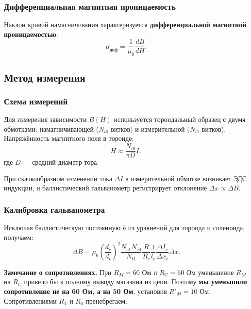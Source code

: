 \documentclass[a4paper]{article}
\begin{document}
	\subsubsection{Дифференциальная магнитная проницаемость}
	
	Наклон кривой намагничивания характеризуется \textbf{дифференциальной магнитной проницаемостью}:
	\begin{equation}
		\mu_{\text{диф}} = \frac{1}{\mu_0} \frac{dB}{dH}.
		\label{eq:mu_diff}
	\end{equation}
	
	\subsection{Метод измерения}
	
	\subsubsection{Схема измерений}
	
	Для измерения зависимости $B(H)$ используется тороидальный образец с двумя обмотками: намагничивающей ($N_{t0}$ витков) и измерительной ($N_{t1}$ витков). Напряжённость магнитного поля в тороиде:
	\begin{equation}
		H \approx \frac{N_{t0}}{\pi D} I,
		\label{eq:H}
	\end{equation}
	где $D$ — средний диаметр тора.
	
	При скачкообразном изменении тока $\Delta I$ в измерительной обмотке возникает ЭДС индукции, и баллистический гальванометр регистрирует отклонение $\Delta x \propto \Delta B$.
	
	\subsubsection{Калибровка гальванометра}
	
	Исключая баллистическую постоянную $b$ из уравнений для тороида и соленоида, получаем:
	\begin{equation}
		\Delta B = \mu_0 \left(\frac{d_c}{d_t}\right)^2 \frac{N_{c1} N_{c0}}{N_{t1}} \frac{R}{R_c} \frac{1}{l_c} \frac{\Delta I_c}{\Delta x_c} \Delta x.
		\label{eq:dB}
	\end{equation}
	
	\textbf{Замечание о сопротивлениях.} При $R_M = 60$ Ом и $R_C = 60$ Ом уменьшение $R_M$ на $R_C$ привело бы к полному выводу магазина из цепи. Поэтому \textbf{мы уменьшили сопротивление не на 60 Ом, а на 50 Ом}, установив $R'_M = 10$ Ом. Сопротивлениями $R_T$ и $R_0$ пренебрегаем.
	
\end{document}
